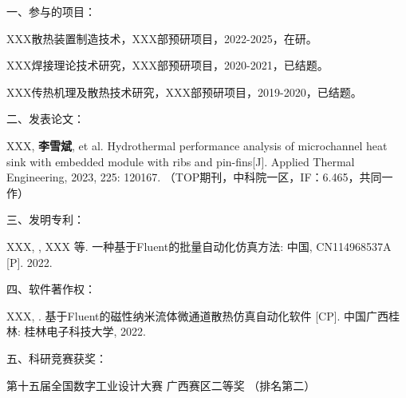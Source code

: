 
\noindent %
一、参与的项目：
\begingroup
\setlength{\itemsep}{0bp}\setlength{\parskip}{0pt}
    \begin{enumerate}[label={[\arabic*]}] %
        \item XXX散热装置制造技术，XXX部预研项目，2022-2025，在研。
        \item XXX焊接理论技术研究，XXX部预研项目，2020-2021，已结题。
        \item XXX传热机理及散热技术研究，XXX部预研项目，2019-2020，已结题。
        \end{enumerate}
\endgroup
\vspace{3mm}

\noindent %
二、发表论文：
\begingroup
\setlength{\itemsep}{0bp}\setlength{\parskip}{0pt}
    \begin{enumerate}[label={[\arabic*]}] 
        \item XXX, {\bfseries{李雪斌}}, et al. Hydrothermal performance analysis of microchannel heat sink with embedded module with ribs and pin-fins[J]. Applied Thermal Engineering, 2023, 225: 120167. （TOP期刊，中科院一区，IF：6.465，共同一作）
    \end{enumerate}
\endgroup
\vspace{3mm}

\noindent %
三、发明专利：
\begingroup
\setlength{\itemsep}{0bp}\setlength{\parskip}{0pt}
    \begin{enumerate}[label={[\arabic*]}]  
        \item XXX, , XXX 等. 一种基于Fluent的批量自动化仿真方法: 中国, CN114968537A [P]. 2022. 
    \end{enumerate}
\endgroup
\vspace{3mm}

\noindent %
四、软件著作权：
\begingroup
\setlength{\itemsep}{0bp}\setlength{\parskip}{0pt}
    \begin{enumerate}[label={[\arabic*]}]  
        \item XXX, . 基于Fluent的磁性纳米流体微通道散热仿真自动化软件 [CP]. 中国广西桂林: 桂林电子科技大学, 2022.
    \end{enumerate}
\endgroup
\vspace{3mm}

\noindent %
五、科研竞赛获奖：
\begingroup
    \setlength{\itemsep}{0bp}\setlength{\parskip}{0pt}
    \begin{enumerate}[label={[\arabic*]}]  
        \item 第十五届全国数字工业设计大赛 广西赛区二等奖 （排名第二）   
    \end{enumerate}
\endgroup


